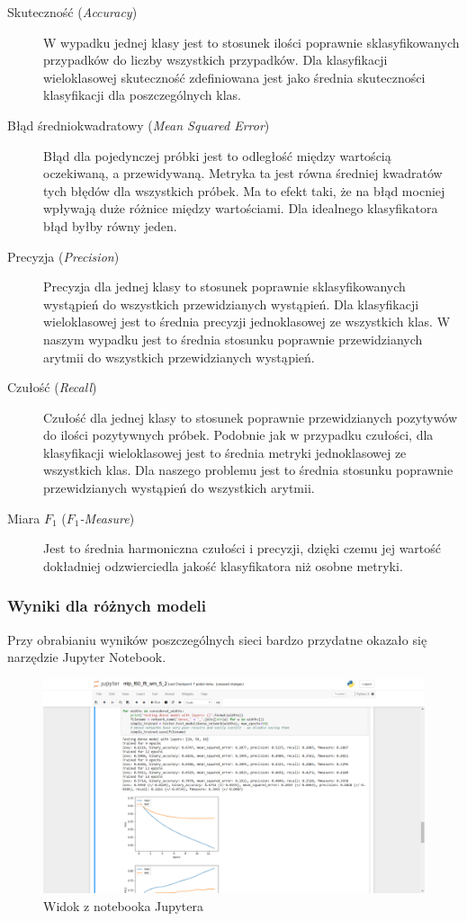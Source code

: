 \documentclass[polish,12pt]{aghthesis}
\begin{document}
\begin{description}
\item [Skuteczność (\emph{Accuracy})] W wypadku jednej klasy jest to stosunek ilości poprawnie sklasyfikowanych przypadków do liczby wszystkich przypadków. Dla klasyfikacji wieloklasowej skuteczność zdefiniowana jest jako średnia skuteczności klasyfikacji dla poszczególnych klas.

\item [Błąd średniokwadratowy (\emph{Mean Squared Error})] Błąd dla pojedynczej próbki jest to odległość między wartością oczekiwaną, a przewidywaną. Metryka ta jest równa średniej kwadratów tych błędów dla wszystkich próbek. Ma to efekt taki, że na błąd mocniej wpływają duże różnice między wartościami. Dla idealnego klasyfikatora błąd byłby równy jeden.

\item [Precyzja (\emph{Precision})] Precyzja dla jednej klasy to stosunek poprawnie sklasyfikowanych wystąpień do wszystkich przewidzianych wystąpień. Dla klasyfikacji wieloklasowej jest to średnia precyzji jednoklasowej ze wszystkich klas. W naszym wypadku jest to średnia stosunku poprawnie przewidzianych arytmii do wszystkich przewidzianych wystąpień.

\item [Czułość (\emph{Recall})] Czułość dla jednej klasy to stosunek poprawnie przewidzianych pozytywów do ilości pozytywnych próbek. Podobnie jak w przypadku czułości, dla klasyfikacji wieloklasowej jest to średnia metryki jednoklasowej ze wszystkich klas. Dla naszego problemu jest to średnia stosunku poprawnie przewidzianych wystąpień do wszystkich arytmii.

\item [Miara $F_1$ (\emph{$F_1$-Measure})] Jest to średnia harmoniczna czułości i precyzji, dzięki czemu jej wartość dokładniej odzwierciedla jakość klasyfikatora niż osobne metryki.
\end{description}


\subsubsection{Wyniki dla różnych modeli}

Przy obrabianiu wyników poszczególnych sieci bardzo przydatne okazało się narzędzie Jupyter Notebook.
\begin{figure}[H]
	\centering
	\includegraphics[width=0.7\linewidth]{jupyter.png}
	\caption{Widok z notebooka Jupytera}
	\label{fig:jupyter}
\end{figure}
\end{document}
